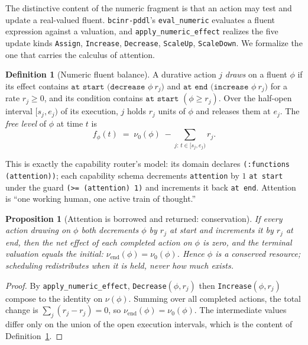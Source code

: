 \documentclass[11pt,oneside]{book}
\theoremstyle{definition}
\newtheorem{definition}{Definition}[chapter]
\theoremstyle{plain}
\newtheorem{proposition}[theorem]{Proposition}
\theoremstyle{remark}
\newcommand{\code}[1]{\texttt{#1}}
\begin{document}
The distinctive content of the numeric fragment is that an action may test and update a
real-valued fluent. \code{bcinr-pddl}'s \code{eval\_numeric} evaluates a fluent expression
against a valuation, and \code{apply\_numeric\_effect} realizes the five update kinds
\code{Assign}, \code{Increase}, \code{Decrease}, \code{ScaleUp}, \code{ScaleDown}. We
formalize the one that carries the calculus of attention.

\begin{definition}[Numeric fluent balance]\label{def:balance}
A durative action $j$ \emph{draws} on a fluent $\phi$ if its effect contains
$\code{at start (decrease } \phi\ r_j)$ and $\code{at end (increase } \phi\ r_j)$ for a rate
$r_j\ge 0$, and its condition contains $\code{at start } (\phi \ge r_j)$. Over the half-open
interval $[s_j,e_j)$ of its execution, $j$ holds $r_j$ units of $\phi$ and releases them at
$e_j$. The \emph{free level} of $\phi$ at time $t$ is
\[
f_\phi(t)\;=\;\nu_0(\phi)\;-\!\!\sum_{j:\,t\in[s_j,e_j)}\!\! r_j .
\]
\end{definition}

This is exactly the capability router's model: its domain declares \code{(:functions
(attention))}; each capability schema decrements \code{attention} by $1$ \code{at start} under
the guard \code{(>= (attention) 1)} and increments it back \code{at end}. Attention is ``one
working human, one active train of thought.''

\begin{proposition}[Attention is borrowed and returned: conservation]\label{prop:conserve}
If every action drawing on $\phi$ both decrements $\phi$ by $r_j$ at start and increments it by
$r_j$ at end, then the net effect of each completed action on $\phi$ is zero, and the terminal
valuation equals the initial: $\nu_{\text{end}}(\phi)=\nu_0(\phi)$. Hence $\phi$ is a conserved
resource; scheduling redistributes \emph{when} it is held, never \emph{how much} exists.
\end{proposition}

\begin{proof}
By \code{apply\_numeric\_effect}, \code{Decrease}$(\phi,r_j)$ then \code{Increase}$(\phi,r_j)$
compose to the identity on $\nu(\phi)$. Summing over all completed actions, the total change is
$\sum_j (r_j-r_j)=0$, so $\nu_{\text{end}}(\phi)=\nu_0(\phi)$. The intermediate values differ
only on the union of the open execution intervals, which is the content of
Definition~\ref{def:balance}. \end{proof}
\end{document}
